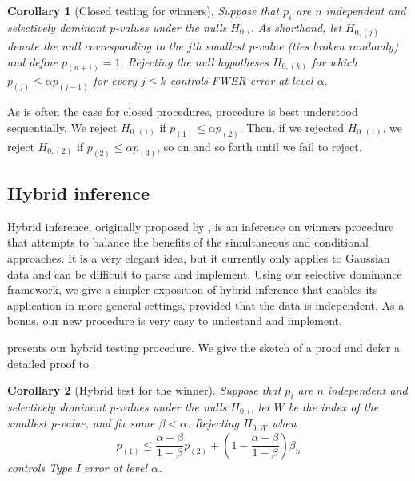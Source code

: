 \documentclass{article}
\newtheorem{corollary}{Corollary}
\begin{document}
\begin{corollary}[Closed testing for winners]
    \label{cor:cond_closed}
    Suppose that $p_i$ are $n$ independent and selectively dominant p-values under the nulls $H_{0, i}$. As shorthand, let $H_{0, (j)}$ denote the null corresponding to the $j$th smallest p-value (ties broken randomly) and define $p_{(n+1)} = 1$.  Rejecting the null hypotheses $H_{0, (k)}$ for which $p_{(j)} \leq \alpha p_{(j-1)} $ for every $j \leq k$ controls FWER error at level $\alpha$. 
\end{corollary}

As is often the case for closed procedures,  procedure is best understood sequentially. We reject $H_{0, (1)}$ if $p_{(1)} \leq \alpha p_{(2)}$. Then, if we rejected  $H_{0, (1)}$, we reject $H_{0, (2)}$ if $p_{(2)} \leq \alpha p_{(3)}$, so on and so forth until we fail to reject. 

\subsection{Hybrid inference}

Hybrid inference, originally proposed by \cite{Andrews2023}, is an inference on winners procedure that attempts to balance the benefits of the simultaneous and conditional approaches. It is a very elegant idea, but it currently only applies to Gaussian data and can be difficult to parse and implement. Using our selective dominance framework, we give a simpler exposition of hybrid inference that enables its application in more general settings, provided that the data is independent. As a bonus, our new procedure is very easy to undestand and implement.

 presents our hybrid testing procedure. We give the sketch of a proof and defer a detailed proof to . 

\begin{corollary}[Hybrid test for the winner]
    \label{cor:hyb}
    Suppose that $p_i$ are $n$ independent and selectively dominant p-values under the nulls $H_{0, i}$, let $W$ be the index of the smallest p-value, and fix some $\beta < \alpha$. Rejecting $H_{0, W}$ when 
    \begin{equation}
        \label{eq:hybrid_cutoff_thm}
        p_{(1)} \leq \frac{\alpha-\beta}{1-\beta}p_{(2)}  + \left(1 - \frac{\alpha - \beta}{1 - \beta}\right) \beta_n
    \end{equation} 
    controls Type I error at level $\alpha$. 
\end{corollary}
\end{document}
